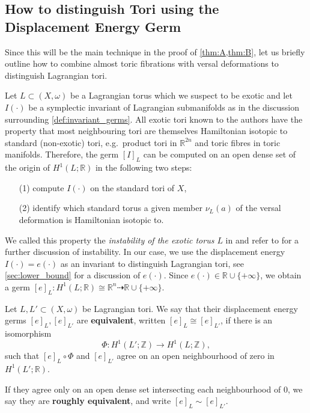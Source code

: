 \documentclass[12pt,a4paper,abstract=true,final]{scrartcl}
\begin{document}
\subsection{How to distinguish Tori using the Displacement Energy Germ}
\label{sec:howto_exotic}

Since this will be the main technique in the proof of \cref{thm:A,thm:B}, let us briefly outline how to combine almost toric fibrations with versal deformations to distinguish Lagrangian tori. 

Let $L \subset (X,\omega)$ be a Lagrangian torus which we suspect to be exotic and let $I(\cdot)$ be a symplectic invariant of Lagrangian submanifolds as in the discussion surrounding \cref{def:invariant_germs}.
All exotic tori known to the authors have the property that most neighbouring tori are themselves Hamiltonian isotopic to standard (non-exotic) tori, e.g.\ product tori in $\mathbb{R}^{2n}$ and toric fibres in toric manifolds.
Therefore, the germ $[I]_L$ can be computed on an open dense set of the origin of $H^1(L;\mathbb{R})$ in the following two steps: 
\begin{enumerate}
    \item[(1)] compute $I(\cdot)$ on the standard tori of $X$, 
    \item[(2)] identify which standard torus a given member $\nu_L(a)$ of the versal deformation is Hamiltonian isotopic to. 
\end{enumerate}
We called this property the \textit{instability of the exotic torus $L$} in \cite{brendel2023local} and refer to \cite[Sections 1.6, 5.1]{brendel2023local} for a further discussion of instability.
In our case, we use the displacement energy $I(\cdot) = e(\cdot)$ as an invariant to distinguish Lagrangian tori, see \cref{sec:lower_bound} for a discussion of $e(\cdot)$.
Since $e(\cdot) \in \mathbb{R} \cup \{+\infty\}$, we obtain a germ $[e]_L \colon H^1(L;\mathbb{R}) \cong \mathbb{R}^n \dashrightarrow \mathbb{R} \cup \{+\infty\}$. 

\begin{definition}
    \label{def:deg_equiv}
    Let $L,L' \subset (X,\omega)$ be Lagrangian tori.
We say that their displacement energy germs $[e]_L,[e]_{L'}$ are \textbf{equivalent}, written $[e]_L \cong [e]_{L'}$, if there is an isomorphism 
    \begin{equation}
        \label{eq:phi_isomorphism}
        Φ \colon H^1(L';\mathbb{Z}) \rightarrow H^1(L;\mathbb{Z}),
    \end{equation}
    such that $[e]_L \circ Φ$ and $[e]_{L'}$ agree on an open neighbourhood of zero in $H^1(L';\mathbb{R})$.
    
    If they agree only on an open dense set intersecting each neighbourhood of $0$, we say they are \textbf{roughly equivalent}, and write $[e]_L \sim [e]_{L'}$.
\end{definition}
\end{document}
